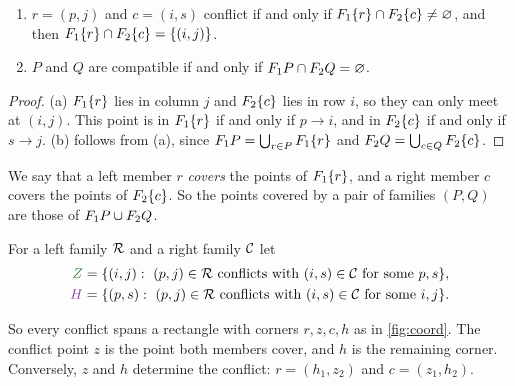 \begin{lemma}\label{lem:conflict-geometry}
\begin{enumerate}[label=(\alph*)]
\item $r=(p,j)$ and $c=(i,s)$ conflict if and only if $F_1\{r\}\cap F_2\{c\}\ne\varnothing$,
and then $F_1\{r\}\cap F_2\{c\}=\{(i,j)\}$.
\item $P$ and $Q$ are compatible if and only if $F_1 P\cap F_2 Q=\varnothing$.
\end{enumerate}
\end{lemma}

\begin{proof}
(a) $F_1\{r\}$ lies in column $j$ and $F_2\{c\}$ lies in row $i$, so they can
only meet at $(i,j)$. This point is in $F_1\{r\}$ if and only if $p\to i$, and
in $F_2\{c\}$ if and only if $s\to j$. (b) follows from (a), since
$F_1 P=\bigcup_{r\in P}F_1\{r\}$ and $F_2 Q=\bigcup_{c\in Q}F_2\{c\}$.
\end{proof}

We say that a left member $r$ \emph{covers} the points of $F_1\{r\}$, and a
right member $c$ covers the points of $F_2\{c\}$. So the points covered by a
pair of families $(P,Q)$ are those of $F_1 P\cup F_2 Q$.

\begin{definition}\label{def:ZH}
For a left family $\mathcal R$ and a right family $\mathcal C$ let
\begin{align*}
 \cZ{Z}&=\{(i,j):\ (p,j)\in\Rf\text{ conflicts with }(i,s)\in\Cf\text{ for some }p,s\},\\
 \cH{H}&=\{(p,s):\ (p,j)\in\Rf\text{ conflicts with }(i,s)\in\Cf\text{ for some }i,j\}.
\end{align*}
\end{definition}

So every conflict spans a rectangle with corners $r,z,c,h$ as in
\cref{fig:coord}. The conflict point $z$ is the point both members cover,
and $h$ is the remaining corner. Conversely, $z$ and $h$ determine the
conflict: $r=(h_1,z_2)$ and $c=(z_1,h_2)$.

